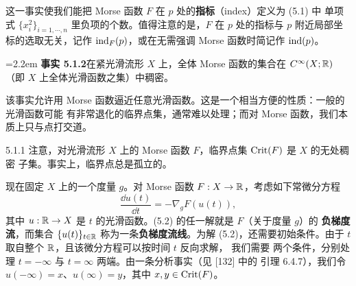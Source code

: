 
这一事实使我们能把 Morse 函数 $F$ 在 $p$ 处的\textbf{指标}（index）定义为 (5.1) 中
单项式 $\{x_i^2\}_{i=1,\cdots,n}$ 里负项的个数。值得注意的是，$F$ 在 $p$ 处的指标与
$p$ 附近局部坐标的选取无关，记作 $\operatorname{ind}_F(p)$，或在无需强调 Morse 函数时简记作
$\operatorname{ind}(p)$。


\par\medskip\noindent\hangindent=2.2em
\textbf{事实 5.1.2}\quad 在紧光滑流形 $X$ 上，全体 Morse 函数的集合在
$C^\infty(X;\mathbb{R})$（即 $X$ 上全体光滑函数之集）中稠密。

该事实允许用 Morse 函数逼近任意光滑函数。这是一个相当方便的性质：一般的光滑函数可能
有非常退化的临界点集，通常难以处理；而对 Morse 函数，我们本质上只与点打交道。


\begin{wrem}{5.1.1}
注意，对光滑流形 $X$ 上的 Morse 函数 $F$，临界点集 $\operatorname{Crit}(F)$ 是 $X$ 的无处稠密
子集。事实上，临界点总是孤立的。
\end{wrem}


现在固定 $X$ 上的一个度量 $g$。对 Morse 函数 $F:X\to\mathbb{R}$，考虑如下常微分方程
\begin{equation}\tag{5.2}
\frac{\dd u(t)}{\dd t}=-\nabla_g F(u(t)),
\end{equation}
其中 $u:\mathbb{R}\to X$ 是 $t$ 的光滑函数。(5.2) 的任一解就是 $F$（关于度量 $g$）的
\textbf{负梯度流}，而集合 $\{u(t)\}_{t\in\mathbb{R}}$ 称为一条\textbf{负梯度流线}。为解
(5.2)，还需要初始条件。由于 $t$ 取自整个 $\mathbb{R}$，且该微分方程可以按时间 $t$ 反向求解，
我们需要
两个条件，分别处理 $t=-\infty$ 与 $t=\infty$ 两端。由一条分析事实（见 [132] 中的
引理 6.4.7），我们令 $u(-\infty)=x$、$u(\infty)=y$，其中 $x,y\in\operatorname{Crit}(F)$。

